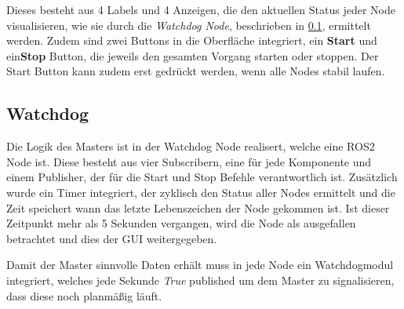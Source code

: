 Dieses besteht aus 4 Labels und 4 Anzeigen, die den aktuellen Status jeder Node visualisieren, wie sie durch die \textit{Watchdog Node}, beschrieben in \ref{sec:watchdog_node}, ermittelt werden. Zudem sind zwei Buttons in die Oberfläche integriert, ein \textbf{Start} und ein\textbf{Stop} Button, die jeweils den gesamten Vorgang starten oder stoppen. Der Start Button kann zudem erst gedrückt werden, wenn alle Nodes stabil laufen.  
 
\subsection{Watchdog}
\label{sec:watchdog_node}
Die Logik des Masters ist in der Watchdog Node realisert, welche eine ROS2 Node ist. Diese besteht aus vier Subscribern, eine für jede Komponente und einem Publisher, der für die Start und Stop Befehle verantwortlich ist. Zusätzlich wurde ein Timer integriert, der zyklisch den Status aller Nodes ermittelt und die Zeit speichert wann das letzte Lebenszeichen der Node gekommen ist. Ist dieser Zeitpunkt mehr als 5 Sekunden vergangen, wird die Node als ausgefallen betrachtet und dies der GUI weitergegeben. 

Damit der Master sinnvolle Daten erhält muss in jede Node ein Watchdogmodul integriert, welches jede Sekunde \textit{True} published um dem Master zu signalisieren, dass diese noch planmäßig läuft. 